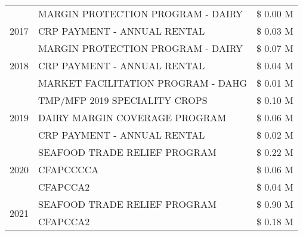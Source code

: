 \begin{tabular}{llr}
 & MARGIN PROTECTION PROGRAM - DAIRY & \$ 0.00 M \\
\cline{1-3}
2017 & CRP PAYMENT - ANNUAL RENTAL & \$ 0.03 M \\
\cline{1-3}
\multirow[t]{3}{*}{2018} & MARGIN PROTECTION PROGRAM - DAIRY & \$ 0.07 M \\
 & CRP PAYMENT - ANNUAL RENTAL & \$ 0.04 M \\
 & MARKET FACILITATION PROGRAM - DAHG & \$ 0.01 M \\
\cline{1-3}
\multirow[t]{3}{*}{2019} & TMP/MFP 2019 SPECIALITY CROPS & \$ 0.10 M \\
 & DAIRY MARGIN COVERAGE PROGRAM & \$ 0.06 M \\
 & CRP PAYMENT - ANNUAL RENTAL & \$ 0.02 M \\
\cline{1-3}
\multirow[t]{3}{*}{2020} & SEAFOOD TRADE RELIEF PROGRAM & \$ 0.22 M \\
 & CFAPCCCCA & \$ 0.06 M \\
 & CFAPCCA2 & \$ 0.04 M \\
\cline{1-3}
\multirow[t]{2}{*}{2021} & SEAFOOD TRADE RELIEF PROGRAM & \$ 0.90 M \\
 & CFAPCCA2 & \$ 0.18 M \\
\cline{1-3}
\bottomrule
\end{tabular}
